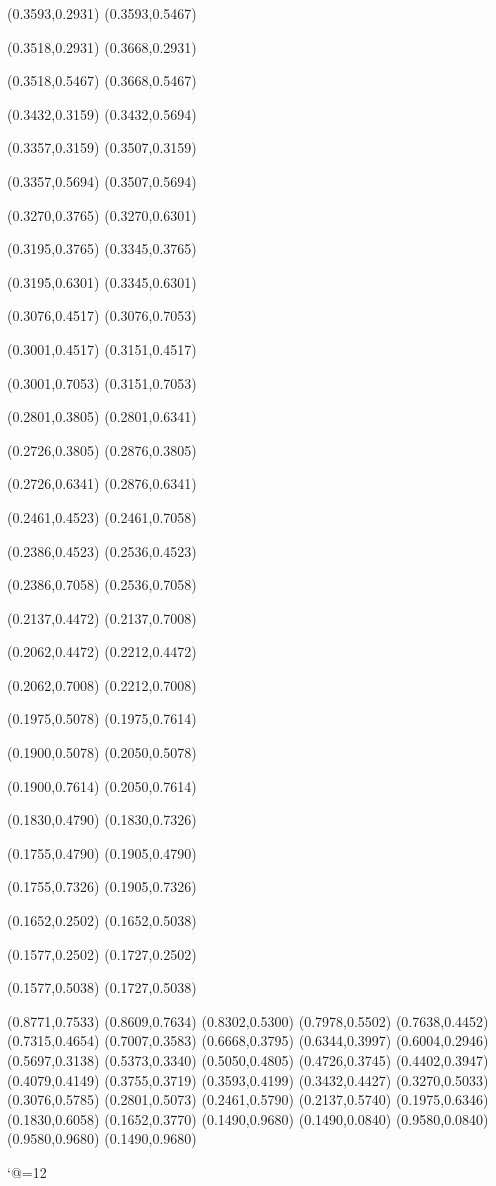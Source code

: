 \PST@Solid(0.3593,0.2931)
(0.3593,0.5467)

\PST@Solid(0.3518,0.2931)
(0.3668,0.2931)

\PST@Solid(0.3518,0.5467)
(0.3668,0.5467)

\PST@Solid(0.3432,0.3159)
(0.3432,0.5694)

\PST@Solid(0.3357,0.3159)
(0.3507,0.3159)

\PST@Solid(0.3357,0.5694)
(0.3507,0.5694)

\PST@Solid(0.3270,0.3765)
(0.3270,0.6301)

\PST@Solid(0.3195,0.3765)
(0.3345,0.3765)

\PST@Solid(0.3195,0.6301)
(0.3345,0.6301)

\PST@Solid(0.3076,0.4517)
(0.3076,0.7053)

\PST@Solid(0.3001,0.4517)
(0.3151,0.4517)

\PST@Solid(0.3001,0.7053)
(0.3151,0.7053)

\PST@Solid(0.2801,0.3805)
(0.2801,0.6341)

\PST@Solid(0.2726,0.3805)
(0.2876,0.3805)

\PST@Solid(0.2726,0.6341)
(0.2876,0.6341)

\PST@Solid(0.2461,0.4523)
(0.2461,0.7058)

\PST@Solid(0.2386,0.4523)
(0.2536,0.4523)

\PST@Solid(0.2386,0.7058)
(0.2536,0.7058)

\PST@Solid(0.2137,0.4472)
(0.2137,0.7008)

\PST@Solid(0.2062,0.4472)
(0.2212,0.4472)

\PST@Solid(0.2062,0.7008)
(0.2212,0.7008)

\PST@Solid(0.1975,0.5078)
(0.1975,0.7614)

\PST@Solid(0.1900,0.5078)
(0.2050,0.5078)

\PST@Solid(0.1900,0.7614)
(0.2050,0.7614)

\PST@Solid(0.1830,0.4790)
(0.1830,0.7326)

\PST@Solid(0.1755,0.4790)
(0.1905,0.4790)

\PST@Solid(0.1755,0.7326)
(0.1905,0.7326)

\PST@Solid(0.1652,0.2502)
(0.1652,0.5038)

\PST@Solid(0.1577,0.2502)
(0.1727,0.2502)

\PST@Solid(0.1577,0.5038)
(0.1727,0.5038)

\PST@Diamond(0.8771,0.7533)
\PST@Diamond(0.8609,0.7634)
\PST@Diamond(0.8302,0.5300)
\PST@Diamond(0.7978,0.5502)
\PST@Diamond(0.7638,0.4452)
\PST@Diamond(0.7315,0.4654)
\PST@Diamond(0.7007,0.3583)
\PST@Diamond(0.6668,0.3795)
\PST@Diamond(0.6344,0.3997)
\PST@Diamond(0.6004,0.2946)
\PST@Diamond(0.5697,0.3138)
\PST@Diamond(0.5373,0.3340)
\PST@Diamond(0.5050,0.4805)
\PST@Diamond(0.4726,0.3745)
\PST@Diamond(0.4402,0.3947)
\PST@Diamond(0.4079,0.4149)
\PST@Diamond(0.3755,0.3719)
\PST@Diamond(0.3593,0.4199)
\PST@Diamond(0.3432,0.4427)
\PST@Diamond(0.3270,0.5033)
\PST@Diamond(0.3076,0.5785)
\PST@Diamond(0.2801,0.5073)
\PST@Diamond(0.2461,0.5790)
\PST@Diamond(0.2137,0.5740)
\PST@Diamond(0.1975,0.6346)
\PST@Diamond(0.1830,0.6058)
\PST@Diamond(0.1652,0.3770)
\PST@Border(0.1490,0.9680)
(0.1490,0.0840)
(0.9580,0.0840)
(0.9580,0.9680)
(0.1490,0.9680)

\catcode`@=12
\fi
\endpspicture
